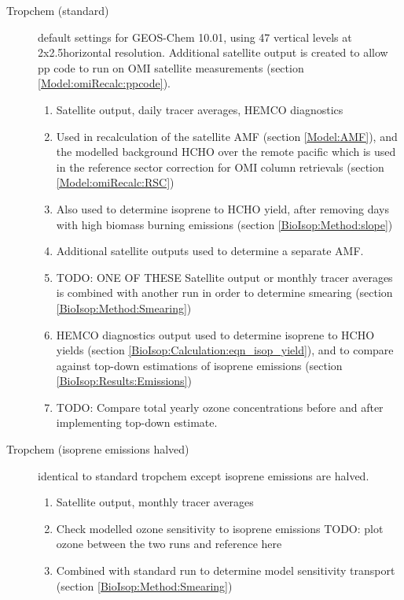 \begin{description}
        \item [Tropchem (standard)]%
          default settings for GEOS-Chem 10.01, using 47 vertical levels at 2x2.5\degr horizontal resolution.
          Additional satellite output is created to allow pp code to run on OMI satellite measurements (section \ref{Model:omiRecalc:ppcode}).
        \begin{enumerate}
          \item Satellite output, daily tracer averages, HEMCO diagnostics
          \item Used in recalculation of the satellite AMF (section \ref{Model:AMF}), and the modelled background HCHO over the remote pacific which is used in the reference sector correction for OMI column retrievals (section \ref{Model:omiRecalc:RSC})
          \item Also used to determine isoprene to HCHO yield, after removing days with high biomass burning emissions (section \ref{BioIsop:Method:slope})
          \item Additional satellite outputs used to determine a separate AMF.
          \item TODO: ONE OF THESE Satellite output or monthly tracer averages is combined with another run in order to determine smearing (section \ref{BioIsop:Method:Smearing})
          \item HEMCO diagnostics output used to determine isoprene to HCHO yields (section \ref{BioIsop:Calculation:eqn_isop_yield}), and to compare against top-down estimations of isoprene emissions (section \ref{BioIsop:Results:Emissions})
          \item TODO: Compare total yearly ozone concentrations before and after implementing top-down estimate.
        \end{enumerate}
        
        \item [Tropchem (isoprene emissions halved)]%
          identical to standard tropchem except isoprene emissions are halved.
        \begin{enumerate}
          \item Satellite output, monthly tracer averages 
          \item Check modelled ozone sensitivity to isoprene emissions TODO: plot ozone between the two runs and reference here
          \item Combined with standard run to determine model sensitivity transport (section \ref{BioIsop:Method:Smearing})
        \end{enumerate}
        

\end{description}
